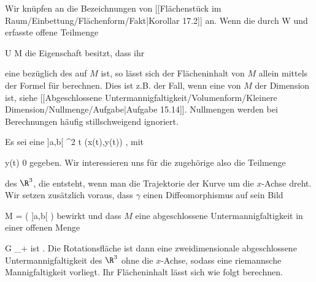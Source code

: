 {}
{

Wir knüpfen an die Bezeichnungen von
[[Flächenstück im Raum/Einbettung/Flächenform/Fakt|Korollar 17.2]]
an. Wenn die durch
\mathkor {} {W} {und} {\varphi} {}
erfasste offene Teilmenge

\mavergleichskette
{\vergleichskette
{ U
}
{ \subseteq }{ M
}
{  }{
}
{    }{
}
{   }{
}
}
{}{}{}
die Eigenschaft besitzt, dass ihr

 eine
bezüglich des
auf $M$ ist, so lässt sich der Flächeninhalt von $M$ allein mittels der Formel für
 berechnen. Dies ist z.B. der Fall, wenn
 eine
von $M$ der Dimension
 ist, siehe
[[Abgeschlossene Untermannigfaltigkeit/Volumenform/Kleinere Dimension/Nullmenge/Aufgabe|Aufgabe 15.14]].
Nullmengen werden bei Berechnungen häufig stillschweigend ignoriert.

}


Es sei eine
\maabbeledisp {\gamma} {]a,b[} {\R^2
} {t} {(x(t),y(t))
} {,}
mit

\mavergleichskette
{\vergleichskette
{ y(t)
}
{ \geq }{ 0
}
{  }{
}
{    }{
}
{   }{
}
}
{}{}{}
gegeben. Wir interessieren uns für die zugehörige
also die Teilmenge

\mathdisp {\left\{  (x(t), y(t) \cos \alpha , y(t) \sin \alpha)   \mid   t \in ]a,b[  , \,  \alpha \in [0,2\pi]       \right\}} {  }

des $\R^3$, die entsteht, wenn man die Trajektorie der Kurve um die $x$-Achse dreht. Wir setzen zusätzlich voraus, dass $\gamma$ einen Diffeomorphismus auf sein Bild

\mavergleichskette
{\vergleichskette
{ M
}
{ = }{ \gamma \left(  ]a,b[  \right)
}
{  }{
}
{    }{
}
{   }{
}
}
{}{}{}
bewirkt und dass $M$ eine abgeschlossene Untermannigfaltigkeit in einer offenen Menge

\mavergleichskettedisp
{\vergleichskette
{ G
}
{ \subseteq} {\R \times \R_+
}
{ } {
}
{ } {
}
{ } {
}
}
{}{}{}
ist
 {} {.}
Die Rotationsfläche ist dann eine zweidimensionale abgeschlossene Untermannigfaltigkeit des $\R^3$ ohne die $x$-Achse, sodass eine riemannsche Mannigfaltigkeit vorliegt. Ihr Flächeninhalt lässt sich wie folgt berechnen.

